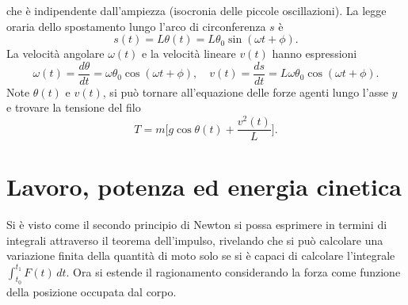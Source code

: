 che è indipendente dall'ampiezza (isocronia delle piccole oscillazioni). La legge oraria dello spostamento lungo l'arco di circonferenza $s$ è
\begin{equation}
    s(t)=L\theta(t)=L\theta_0\sin{(\omega t+\phi)}.
\end{equation}
La velocità angolare $\omega(t)$ e la velocità lineare $v(t)$ hanno espressioni
\begin{equation}
    \omega(t)=\frac{d\theta}{dt}=\omega\theta_0\cos{(\omega t+\phi)},\quad v(t)=\frac{ds}{dt}=L\omega\theta_0\cos{(\omega t+\phi)}.
\end{equation}
Note $\theta(t)$ e $v(t)$, si può tornare all'equazione delle forze agenti lungo l'asse $y$ e trovare la tensione del filo
\begin{equation}
    T=m\bigg[g\cos{\theta(t)}+\frac{v^2(t)}{L}\bigg].
\end{equation}

\section{Lavoro, potenza ed energia cinetica}
Si è visto come il secondo principio di Newton si possa esprimere in termini di integrali attraverso il teorema dell'impulso, rivelando che si può calcolare una variazione finita della quantità di moto solo se si è capaci di calcolare l'integrale $\int_{t_0}^{t_1}F(t)\,dt$. Ora si estende il ragionamento considerando la forza come funzione della posizione occupata dal corpo. 

